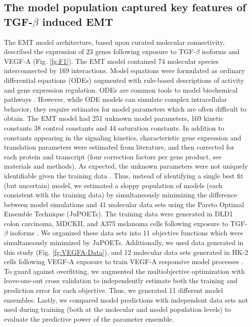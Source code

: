 \documentclass[11pt,letterpaper]{article}
\begin{document}
\subsection*{The model population captured key features of TGF-$\beta$ induced EMT}
The EMT model architecture, based upon curated molecular connectivity,
described the expression of 23 genes following exposure to TGF-$\beta$ isoforms and VEGF-A (Fig. \ref{fg:F1}).
The EMT model contained 74 molecular species interconnected by 169 interactions.
Model equations were formulated as ordinary differential equations (ODEs) augmented with rule-based descriptions of activity and gene expression regulation.
ODEs are common tools to model biochemical pathways \cite{Schoeberl:2002rv,Chen:2009uq,Tasseff:2011ve}.
However, while ODE models can simulate complex intracellular behavior,
they require estimates for model parameters which are often difficult to obtain.
The EMT model had 251 unknown model parameters, 169 kinetic constants 38 control constants and 44 saturation constants.
In addition to constants appearing in the signaling kinetics, characteristic gene expression and translation parameters were estimated from literature,
and then corrected for each protein and transcript (four correction factors per gene product, see materials and methods).
As expected, the unknown parameters were not uniquely identifiable given the training data \cite{Gadkar:2005vn}.
Thus, instead of identifying a single best fit (but uncertain) model,
we estimated a sloppy population of models (each consistent with the training data) by simultaneously minimizing the difference between model simulations and 41 molecular
data sets using the Pareto Optimal Ensemble Technique (JuPOETs).
The training data were generated in DLD1 colon carcinoma, MDCKII, and A375 melanoma cells following
exposure to TGF-$\beta$ isoforms \cite{Medici:2008fk}. We organized these data sets into 11 objective functions which were simultaneously minimized by JuPOETs.
Additionally, we used data generated in this study (Fig. \ref{fg:VEGFA-Data}), and 12 molecular data sets generated in HK-2 cells following VEGF-A exposure to train VEGF-A responsive model processes \cite{Lian:2011bs}.
To guard against overfitting, we augmented the multiobjective optimization with leave-one-out cross validation to independently estimate both the training and
prediction error for each objective. Thus, we generated 11 different model ensembles.
Lastly, we compared model predictions with independent data sets not used during training (both at the molecular and model population
levels) to evaluate the predictive power of the parameter ensemble.
\end{document}

